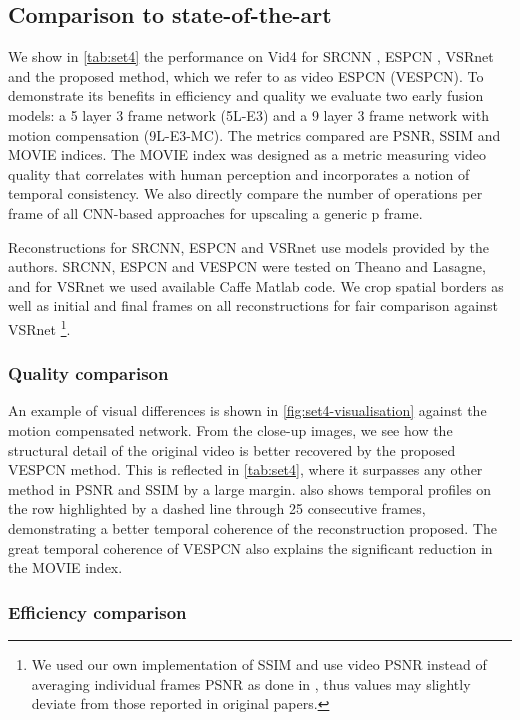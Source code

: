 \documentclass[10pt,twocolumn,letterpaper]{article}
\begin{document}
\subsection{Comparison to state-of-the-art}

We show in \cref{tab:set4} the performance on Vid4 for SRCNN \cite{Dong2015}, ESPCN \cite{Shi2016}, VSRnet \cite{Kappeler2016} and the proposed method, which we refer to as video ESPCN (VESPCN). To demonstrate its benefits in efficiency and quality we evaluate two early fusion models: a 5 layer 3 frame network (5L-E3) and a 9 layer 3 frame network with motion compensation (9L-E3-MC). The metrics compared are \gls{PSNR}, \gls{SSIM} \cite{Wang2004} and MOVIE \cite{Seshadrinathan2010} indices. The MOVIE index was designed as a metric measuring video quality that correlates with human perception and incorporates a notion of temporal consistency. We also directly compare the number of operations per frame of all \gls{CNN}-based approaches for upscaling a generic p frame.

Reconstructions for SRCNN, ESPCN and VSRnet use models provided by the authors. SRCNN, ESPCN and VESPCN were tested on Theano and Lasagne, and for VSRnet we used available Caffe Matlab code. We crop spatial borders as well as initial and final frames on all reconstructions for fair comparison against VSRnet \footnote{We used our own implementation of SSIM and use video PSNR instead of averaging individual frames PSNR as done in \cite{Kappeler2016}, thus values may slightly deviate from those reported in original papers.}.

\subsubsection{Quality comparison}

An example of visual differences is shown in \cref{fig:set4-visualisation} against the motion compensated network. From the close-up images, we see how the structural detail of the original video is better recovered by the proposed VESPCN method. This is reflected in \cref{tab:set4}, where it surpasses any other method in \gls{PSNR} and \gls{SSIM} by a large margin.  also shows temporal profiles on the row highlighted by a dashed line through 25 consecutive frames, demonstrating a better temporal coherence of the reconstruction proposed. The great temporal coherence of VESPCN also explains the significant reduction in the MOVIE index.

\subsubsection{Efficiency comparison}
\end{document}
